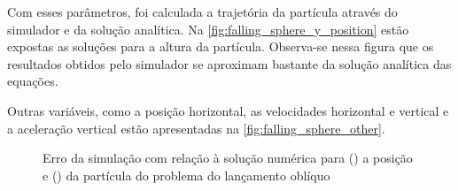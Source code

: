 Com esses parâmetros, foi calculada a trajetória da partícula através do simulador e da solução analítica. Na \cref{fig:falling_sphere_y_position} estão expostas as soluções para a altura da partícula. Observa-se nessa figura que os resultados obtidos pelo simulador se aproximam bastante da solução analítica das equações.

Outras variáveis, como a posição horizontal, as velocidades horizontal e vertical e a aceleração vertical estão apresentadas na \cref{fig:falling_sphere_other}.

\begin{figure}[htb!]
	\caption[Erro da simulação com relação à solução numérica para a posição e da partícula do problema do lançamento oblíquo]{Erro da simulação com relação à solução numérica para () a posição e () da partícula do problema do lançamento oblíquo}
	\centering
	\captionsetup[subfloat]{labelfont=bf}
\end{figure}

